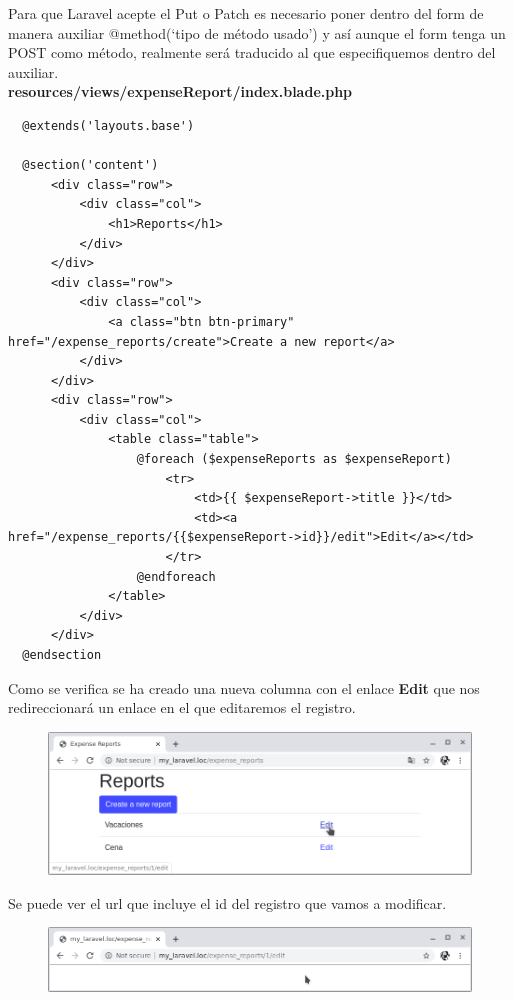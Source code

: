 \documentclass{article}
\begin{document}
Para que Laravel acepte el Put o Patch es necesario poner dentro del form de
manera auxiliar @method(‘tipo de método usado’) y así aunque el form tenga un
POST como método, realmente será traducido al que especifiquemos dentro del
auxiliar.\\

\textbf{resources/views/expenseReport/index.blade.php}
\begin{verbatim}
  @extends('layouts.base')

  @section('content')
      <div class="row">
          <div class="col">
              <h1>Reports</h1>
          </div>
      </div>
      <div class="row">
          <div class="col">
              <a class="btn btn-primary" href="/expense_reports/create">Create a new report</a>
          </div>
      </div>
      <div class="row">
          <div class="col">
              <table class="table">
                  @foreach ($expenseReports as $expenseReport)
                      <tr>
                          <td>{{ $expenseReport->title }}</td>
                          <td><a href="/expense_reports/{{$expenseReport->id}}/edit">Edit</a></td>
                      </tr>
                  @endforeach
              </table>
          </div>
      </div>
  @endsection
\end{verbatim}

Como se verifica se ha creado una nueva columna con el enlace \textbf{Edit} que
nos redireccionará un enlace en el que editaremos el registro.

\begin{figure}[h!]
  \centering
  \includegraphics[scale=0.5]{./Pictures/070_columna_edit.png}
\end{figure}

\newpage

Se puede ver el url que incluye el id del registro que vamos a modificar.

\begin{figure}[h!]
  \centering
  \includegraphics[scale=0.5]{./Pictures/071_url_edit.png}
\end{figure}
\end{document}
